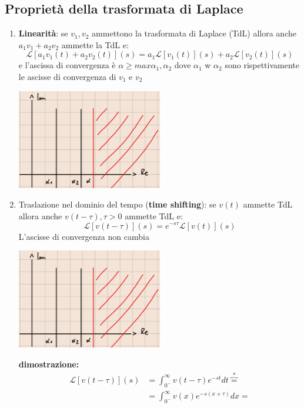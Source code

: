 \documentclass[a4paper, 12pt]{book}
\theoremstyle{plain}
\begin{document}
\subsection{Proprietà della trasformata di Laplace}

\begin{enumerate}
    \item \textbf{Linearità}: se $v_1, v_2$ ammettono la trasformata di Laplace (TdL) allora anche $a_1v_1 + a_2v_2$ ammette la TdL e: \[ \mathcal{L} [a_1v_1(t) + a_2v_2(t)] (s) = a_1 \mathcal{L} [v_1(t)] (s) + a_2 \mathcal{L} [v_2(t)] (s) \] e l'ascissa di convergenza è $\alpha \ge max{\alpha_1, \alpha_2}$ dove $\alpha_1$ w $\alpha_2$ sono rispettivamente le ascisse di convergenza di $v_1$ e $v_2$ \begin{center}
        \includegraphics[width=0.5\textwidth]{RdC3.png}
    \end{center}
    \item Traslazione nel dominio del tempo (\textbf{time shifting}): se $v(t)$ ammette TdL allora anche $v(t - \tau), \tau > 0$ ammette TdL e:
    \[
        \mathcal{L} [v(t - \tau)] (s) = e^{-s \tau} \mathcal{L} [v(t)] (s)
    \]
    L'ascisse di convergenza non cambia
    \begin{center}
        \includegraphics[width=0.5\textwidth]{RdC3.png}
    \end{center}
    \textbf{dimostrazione: } 
    \[
        \begin{split}
            \mathcal{L} [v(t - \tau)] (s) &= \int_{0^-}^\infty v(t - \tau) e^{-st} dt \overbrace{=}^* \\
            &= \int_{0^-}^\infty v(x) e^{-s(x + \tau)} dx = \\

\end{split}\]
\end{enumerate}
\end{document}
